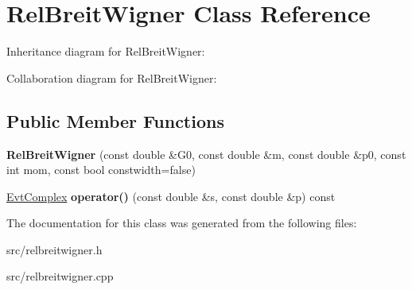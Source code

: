\hypertarget{class_rel_breit_wigner}{}\section{Rel\+Breit\+Wigner Class Reference}
\label{class_rel_breit_wigner}


Inheritance diagram for Rel\+Breit\+Wigner\+:


Collaboration diagram for Rel\+Breit\+Wigner\+:
\subsection*{Public Member Functions}
\begin{DoxyCompactItemize}
\item 
\hypertarget{class_rel_breit_wigner_a457d62ccee485564865b10cec0f94cb7}{}{\bfseries Rel\+Breit\+Wigner} (const double \&G0, const double \&m, const double \&p0, const int mom, const bool constwidth=false)\label{class_rel_breit_wigner_a457d62ccee485564865b10cec0f94cb7}

\item 
\hypertarget{class_rel_breit_wigner_ad81aacc4d6e9a48085c78dfa18d6e973}{}\hyperlink{class_evt_complex}{Evt\+Complex} {\bfseries operator()} (const double \&s, const double \&p) const \label{class_rel_breit_wigner_ad81aacc4d6e9a48085c78dfa18d6e973}

\end{DoxyCompactItemize}


The documentation for this class was generated from the following files\+:\begin{DoxyCompactItemize}
\item 
src/relbreitwigner.\+h\item 
src/relbreitwigner.\+cpp\end{DoxyCompactItemize}
